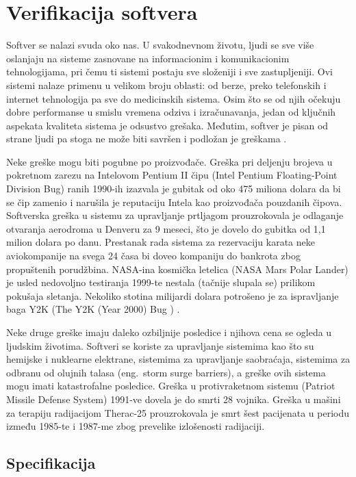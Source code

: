 \documentclass[12pt,oneside]{memoir}
\begin{document}
\chapter{Verifikacija softvera}

Softver se nalazi svuda oko nas. U svakodnevnom životu, ljudi se sve više oslanjaju na sisteme zasnovane na informacionim i komunikacionim tehnologijama, pri čemu ti sistemi postaju sve složeniji i sve zastupljeniji. Ovi sistemi nalaze primenu u velikom broju oblasti: od berze, preko telefonskih i internet tehnologija pa sve do medicinskih sistema. Osim što se od njih očekuju dobre performanse u smislu vremena odziva i izračunavanja, jedan od ključnih aspekata kvaliteta sistema je odsustvo grešaka. Međutim, softver je pisan od strane ljudi pa stoga ne može biti savršen i podložan je greškama \cite{PoMC, SoftTest}.

Neke greške mogu biti pogubne po proizvođače. Greška pri deljenju brojeva u pokretnom zarezu na Intelovom Pentium II čipu (Intel Pentium Floating-Point Division Bug) ranih 1990-ih izazvala je gubitak od oko 475 miliona dolara da bi se čip zamenio i narušila je reputaciju Intela kao proizvođača pouzdanih čipova. Softverska greška u sistemu za upravljanje prtljagom prouzrokovala je odlaganje otvaranja aerodroma u Denveru za 9 meseci, što je dovelo do gubitka od 1,1 milion dolara po danu. Prestanak rada sistema za rezervaciju karata neke aviokompanije na svega 24 časa bi doveo kompaniju do bankrota zbog propuštenih porudžbina. NASA-ina kosmička letelica (NASA Mars Polar Lander) je usled nedovoljno testiranja 1999-te nestala (tačnije slupala se) prilikom pokušaja sletanja. Nekoliko stotina milijardi dolara potrošeno je za ispravljanje baga Y2K (The Y2K (Year 2000) Bug \cite{y2k}) \cite{PoMC, SoftTest}. 

Neke druge greške imaju daleko ozbiljnije posledice i njihova cena se ogleda u ljudskim životima. Softveri se koriste za upravljanje sistemima kao što su hemijske i nuklearne elektrane, sistemima za upravljanje saobraćaja, sistemima za odbranu od olujnih talasa (eng.~storm surge barriers), a greške ovih sistema mogu imati katastrofalne posledice. Greška u protivraketnom sistemu (Patriot Missile Defense System) 1991-ve dovela je do smrti 28 vojnika. Greška u mašini za terapiju radijacijom Therac-25 prouzrokovala je smrt šest pacijenata u periodu između 1985-te i 1987-me zbog prevelike izlošenosti radijaciji.  \cite{PoMC, SoftTest}

\section{Specifikacija}
\end{document}
